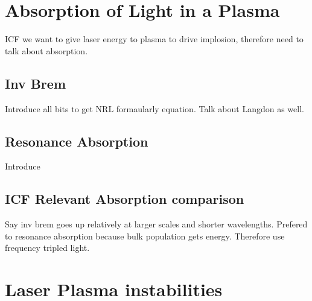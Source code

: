 \section{Absorption of Light in a Plasma}%
\label{sec:theory_absorption}

ICF we want to give laser energy to plasma to drive implosion, therefore need to talk about absorption.

\subsection{Inv Brem}%
\label{sec:theory_in_brem}

Introduce all bits to get NRL formaularly equation.
Talk about Langdon as well.

\subsection{Resonance Absorption}%
\label{sec:theory_res_abs}

Introduce

\subsection{ICF Relevant Absorption comparison}%
\label{sec:theory_absorption_comparison}

Say inv brem goes up relatively at larger scales and shorter wavelengths.
Prefered to resonance absorption because bulk population gets energy.
Therefore use frequency tripled light.


\section{Laser Plasma instabilities}%
\label{sec:theory_LPIs}


